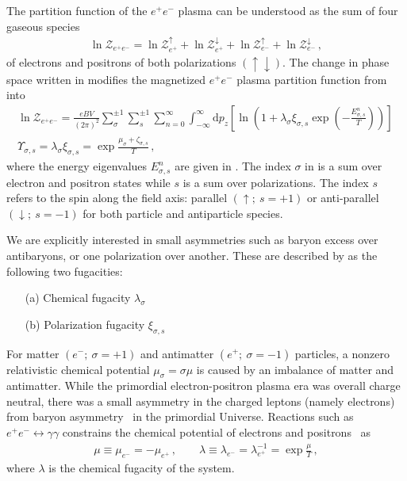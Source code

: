 The partition function of the $e^{+}e^{-}$ plasma can be understood as the sum of four gaseous species
\begin{align}
 \label{partition:0} 
 \ln\mathcal{Z}_{e^{+}e^{-}}=\ln\mathcal{Z}_{e^{+}}^{\uparrow}+\ln\mathcal{Z}_{e^{+}}^{\downarrow}+\ln\mathcal{Z}_{e^{-}}^{\uparrow}+\ln\mathcal{Z}_{e^{-}}^{\downarrow}\,,
\end{align}
of electrons and positrons of both polarizations $(\uparrow\downarrow)$. The change in phase space written in  modifies the magnetized $e^{+}e^{-}$ plasma partition function from  into
\begin{gather}
 \label{partition:1}
 \ln\mathcal{Z}_{e^{+}e^{-}}=\frac{e{B}V}{(2\pi)^{2}}\sum_{\sigma}^{\pm1}\sum_{s}^{\pm1}\sum_{n=0}^{\infty}\int_{-\infty}^{\infty}\mathrm{d}p_{z}\left[\ln\left(1+\lambda_{\sigma}\xi_{\sigma,s}\exp\left(-\frac{E_{\sigma,s}^{n}}{T}\right)\right)\right]\,\\
 \label{partition:2} 
 \Upsilon_{\sigma,s} =\lambda_{\sigma}\xi_{\sigma,s} = \exp{\frac{\mu_{\sigma}+\zeta_{\sigma,s}}{T}}\,,
\end{gather}
where the energy eigenvalues $E_{\sigma,s}^{n}$ are given in . The index $\sigma$ in  is a sum over electron and positron states while $s$ is a sum over polarizations. The index $s$ refers to the spin along the field axis: parallel $(\uparrow;\ s=+1)$ or anti-parallel $(\downarrow;\ s=-1)$ for both particle and antiparticle species.

We are explicitly interested in small asymmetries such as baryon excess over antibaryons, or one polarization over another. These are described by  as the following two fugacities:
\begin{itemize}%
 \item[(a)] Chemical fugacity $\lambda_{\sigma}$
 \item[(b)] Polarization fugacity $\xi_{\sigma,s}$
\end{itemize}
For matter $(e^{-};\ \sigma=+1)$ and antimatter $(e^{+};\ \sigma=-1)$ particles, a nonzero relativistic chemical potential $\mu_{\sigma}=\sigma\mu$ is caused by an imbalance of matter and antimatter. While the primordial electron-positron plasma era was overall charge neutral, there was a small asymmetry in the charged leptons (namely electrons) from baryon asymmetry~\cite{Fromerth:2012fe,Canetti:2012zc} in the primordial Universe. Reactions such as $e^{+}e^{-}\leftrightarrow\gamma\gamma$ constrains the chemical potential of electrons and positrons~\cite{Elze:1980er} as 
\begin{align}
 \label{cpotential}
 \mu\equiv\mu_{e^{-}}=-\mu_{e^{+}}\,,\qquad
 \lambda\equiv\lambda_{e^{-}}=\lambda_{e^{+}}^{-1}=\exp\frac{\mu}{T}\,,
\end{align}
where $\lambda$ is the chemical fugacity of the system.

